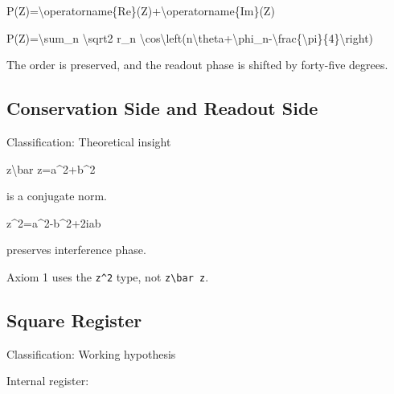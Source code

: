 \documentclass[
  a4paper]{article}
\newenvironment{Shaded}{}{}
\newcommand{\NormalTok}[1]{#1}
\begin{document}
\begin{Shaded}
\begin{Highlighting}[]
\NormalTok{P(Z)=\textbackslash{}operatorname\{Re\}(Z)+\textbackslash{}operatorname\{Im\}(Z)}
\end{Highlighting}
\end{Shaded}

\begin{Shaded}
\begin{Highlighting}[]
\NormalTok{P(Z)=\textbackslash{}sum\_n \textbackslash{}sqrt2 r\_n}
\NormalTok{\textbackslash{}cos\textbackslash{}left(n\textbackslash{}theta+\textbackslash{}phi\_n{-}\textbackslash{}frac\{\textbackslash{}pi\}\{4\}\textbackslash{}right)}
\end{Highlighting}
\end{Shaded}

The order is preserved, and the readout phase is shifted by forty-five
degrees.

\subsection{Conservation Side and Readout
Side}\label{conservation-side-and-readout-side}

Classification: Theoretical insight

\begin{Shaded}
\begin{Highlighting}[]
\NormalTok{z\textbackslash{}bar z=a\^{}2+b\^{}2}
\end{Highlighting}
\end{Shaded}

is a conjugate norm.

\begin{Shaded}
\begin{Highlighting}[]
\NormalTok{z\^{}2=a\^{}2{-}b\^{}2+2iab}
\end{Highlighting}
\end{Shaded}

preserves interference phase.

Axiom 1 uses the \texttt{z\^{}2} type, not
\texttt{z\textbackslash{}bar\ z}.

\subsection{Square Register}\label{square-register}

Classification: Working hypothesis

Internal register:
\end{document}
